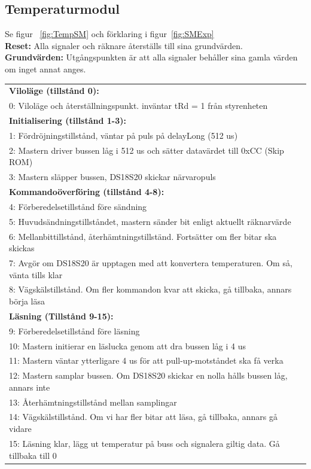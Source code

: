 \documentclass[a4paper,11pt]{article}
\begin{document}
		\subsection{Temperaturmodul}
			Se figur ~\ref{fig:TempSM} och förklaring i figur~\ref{fig:SMExp}\\
			{\bf Reset:} Alla signaler och räknare återställs till sina grundvärden.\\
			{\bf Grundvärden:} Utgångspunkten är att alla signaler behåller sina gamla värden om inget annat anges.\\
			\begin{tabular}{l}
				\\{\bf Viloläge (tillstånd 0):}\\
				0: Viloläge och återställningspunkt. inväntar tRd = 1 från styrenheten\\
				{\bf Initialisering (tillstånd 1-3):}\\
				1: Fördröjningstillstånd, väntar på puls på delayLong (512 us)\\
				2: Mastern driver bussen låg i 512 us och sätter datavärdet till 0xCC (Skip ROM)\\
				3: Mastern släpper bussen, DS18S20 skickar närvaropuls\\
				{\bf Kommandoöverföring (tillstånd 4-8):}\\
				4: Förberedelsetillstånd före sändning\\
				5: Huvudsändningstillståndet, mastern sänder bit enligt aktuellt räknarvärde\\
				6: Mellanbittillstånd, återhämtningstillständ. Fortsätter om fler bitar ska skickas\\
				7: Avgör om DS18S20 är upptagen med att konvertera temperaturen. Om så, vänta tills klar\\
				8: Vägskälstillstånd. Om fler kommandon kvar att skicka, gå tillbaka, annars börja läsa\\
				{\bf Läsning (Tillstånd 9-15):}\\
				9:  Förberedelsetillstånd före läsning\\
				10: Mastern initierar en läslucka genom att dra bussen låg i 4 us\\
				11: Mastern väntar ytterligare 4 us för att pull-up-motståndet ska få verka\\
				12: Mastern samplar bussen. Om DS18S20 skickar en nolla hålls bussen låg, annars inte\\
				13: Återhämtningstillstånd mellan samplingar\\
				14: Vägskälstillstånd. Om vi har fler bitar att läsa, gå tillbaka, annars gå vidare\\
				15: Läsning klar, lägg ut temperatur på buss och signalera giltig data. Gå tillbaka till 0\\
			\end{tabular}
\end{document}
